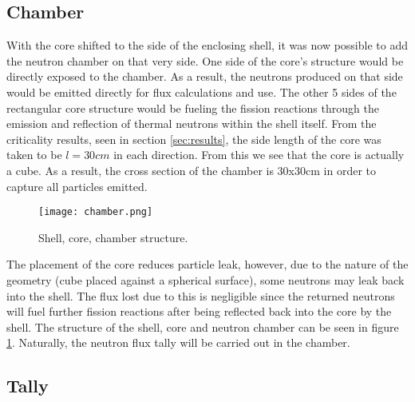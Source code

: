 \subsection{Chamber}

With the core shifted to the side of the enclosing shell, it was now possible to add the neutron chamber on that very side. One side of the core's structure would be directly exposed to the chamber. As a result, the neutrons produced on that side would be emitted directly for flux calculations and use. The other 5 sides of the rectangular core structure would be fueling the fission reactions through the emission and reflection of thermal neutrons within the shell itself. From the criticality results, seen in section \ref{sec:results}, the side length of the core was taken to be $l=30cm$ in each direction. From this we see that the core is actually a cube. As a result, the cross section of the chamber is 30x30cm in order to capture all particles emitted.

\begin{figure}[!htbp]
\caption{Shell, core, chamber structure.}
\label{fig:chamber}
\centering
\texttt{[image: chamber.png]}
\end{figure}

The placement of the core reduces particle leak, however, due to the nature of the geometry (cube placed against a spherical surface), some neutrons may leak back into the shell. The flux lost due to this is negligible since the returned neutrons will fuel further fission reactions after being reflected back into the core by the shell. The structure of the shell, core and neutron chamber can be seen in figure \ref{fig:chamber}. Naturally, the neutron flux tally will be carried out in the chamber.

\subsection{Tally}

